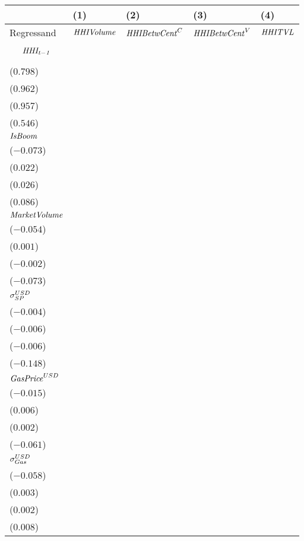 \begin{tabular}{lllll}
\toprule
{} &                                      (1) &                                    (2) &                                    (3) &                                       (4) \\
\midrule
Regressand                 &                        ${\it HHIVolume}$ &                  ${\it HHIBetwCent}^C$ &                  ${\it HHIBetwCent}^V$ &                            ${\it HHITVL}$ \\
$$\it HHI_{t-1}$$          &    \makecell{$0.798^{***}$ \\ ($0.798$)} &  \makecell{$0.962^{***}$ \\ ($0.962$)} &  \makecell{$0.957^{***}$ \\ ($0.957$)} &     \makecell{$0.546^{***}$ \\ ($0.546$)} \\
${\it IsBoom}$             &  \makecell{$-0.004^{***}$ \\ ($-0.073$)} &  \makecell{$0.013^{***}$ \\ ($0.022$)} &  \makecell{$0.017^{***}$ \\ ($0.026$)} &     \makecell{$0.009^{***}$ \\ ($0.086$)} \\
${\it MarketVolume}$       &    \makecell{$-0.002^{*}$ \\ ($-0.054$)} &     \makecell{$0.000^{}$ \\ ($0.001$)} &   \makecell{$-0.001^{}$ \\ ($-0.002$)} &     \makecell{$-0.005^{*}$ \\ ($-0.073$)} \\
${\it \sigma}^{USD}_{SP}$  &     \makecell{$-0.010^{}$ \\ ($-0.004$)} &   \makecell{$-0.134^{}$ \\ ($-0.006$)} &   \makecell{$-0.150^{}$ \\ ($-0.006$)} &   \makecell{$-0.546^{***}$ \\ ($-0.148$)} \\
${\it GasPrice}^{USD}$     &     \makecell{$-3.508^{}$ \\ ($-0.015$)} &    \makecell{$13.792^{}$ \\ ($0.006$)} &     \makecell{$5.810^{}$ \\ ($0.002$)} &  \makecell{$-23.044^{***}$ \\ ($-0.061$)} \\
${\it \sigma}_{Gas}^{USD}$ &   \makecell{$-0.011^{**}$ \\ ($-0.058$)} &     \makecell{$0.006^{}$ \\ ($0.003$)} &     \makecell{$0.005^{}$ \\ ($0.002$)} &        \makecell{$0.002^{}$ \\ ($0.008$)} \\

\end{tabular}
